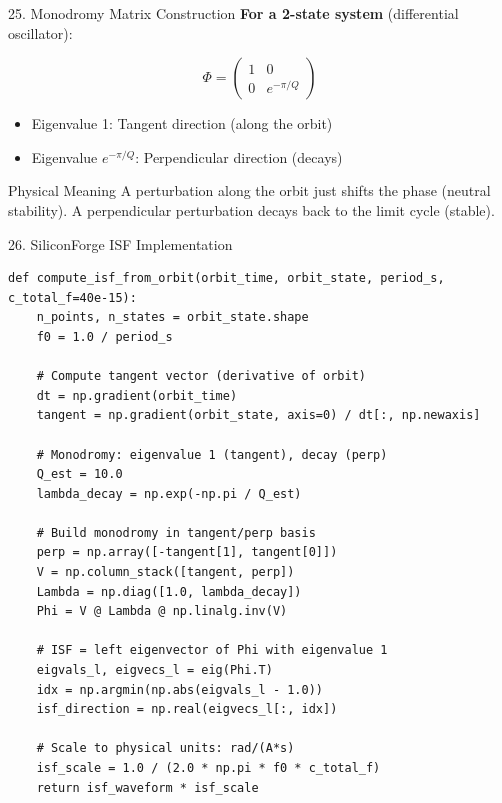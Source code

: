 \documentclass[aspectratio=169, 11pt]{beamer}
\begin{document}
\begin{frame}{25. Monodromy Matrix Construction}
    \textbf{For a 2-state system} (differential oscillator):

    \vspace{0.5em}
    \[ \Phi = \begin{pmatrix} 1 & 0 \\ 0 & e^{-\pi/Q} \end{pmatrix} \]

    \vspace{0.5em}
    \begin{itemize}
        \item Eigenvalue 1: Tangent direction (along the orbit)
        \item Eigenvalue $e^{-\pi/Q}$: Perpendicular direction (decays)
    \end{itemize}

    \vspace{0.5em}
    \begin{block}{Physical Meaning}
        A perturbation along the orbit just shifts the phase (neutral stability). A perpendicular perturbation decays back to the limit cycle (stable).
    \end{block}
\end{frame}

\begin{frame}{26. SiliconForge ISF Implementation}
    \begin{lstlisting}
def compute_isf_from_orbit(orbit_time, orbit_state, period_s, c_total_f=40e-15):
    n_points, n_states = orbit_state.shape
    f0 = 1.0 / period_s

    # Compute tangent vector (derivative of orbit)
    dt = np.gradient(orbit_time)
    tangent = np.gradient(orbit_state, axis=0) / dt[:, np.newaxis]

    # Monodromy: eigenvalue 1 (tangent), decay (perp)
    Q_est = 10.0
    lambda_decay = np.exp(-np.pi / Q_est)

    # Build monodromy in tangent/perp basis
    perp = np.array([-tangent[1], tangent[0]])
    V = np.column_stack([tangent, perp])
    Lambda = np.diag([1.0, lambda_decay])
    Phi = V @ Lambda @ np.linalg.inv(V)

    # ISF = left eigenvector of Phi with eigenvalue 1
    eigvals_l, eigvecs_l = eig(Phi.T)
    idx = np.argmin(np.abs(eigvals_l - 1.0))
    isf_direction = np.real(eigvecs_l[:, idx])

    # Scale to physical units: rad/(A*s)
    isf_scale = 1.0 / (2.0 * np.pi * f0 * c_total_f)
    return isf_waveform * isf_scale
    \end{lstlisting}
\end{frame}
\end{document}
